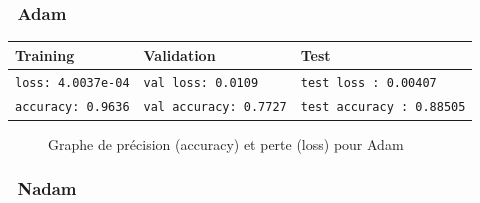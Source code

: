 	\subsubsection*{\qquad \textbullet \ Adam}
		\begin{table}[H]
			\centering
			\begin{tabular}{l|l|l}
				\hline
				\textbf{Training} & \textbf{Validation} & \textbf{Test} \\
				\hline

				\texttt{loss: 4.0037e-04} & \texttt{val loss: 0.0109} & \texttt{test loss : 0.00407} \\
				\texttt{accuracy: 0.9636} & \texttt{val accuracy: 0.7727} & \texttt{test accuracy : 0.88505} \\
				
				\hline
				
			\end{tabular}
		\end{table}
		\begin{figure}[H]
			\myfloatalign
			 \quad
			
			\caption[]{Graphe de précision (accuracy) et perte (loss)  pour Adam}
		\end{figure}
		
	\subsubsection*{\qquad \textbullet \ Nadam}
	
